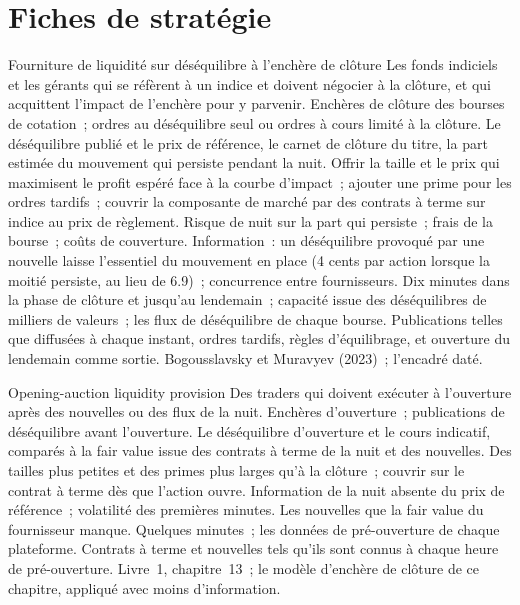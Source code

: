 \section{Fiches de stratégie}

\begin{strategyfile}{Fourniture de liquidité sur déséquilibre à l'enchère de clôture}\label{strat:hf:auctions-and-the-close:close}
 Les fonds indiciels et les gérants qui se réfèrent à un indice et doivent négocier à la clôture, et qui acquittent l'impact de l'enchère pour y parvenir.
 Enchères de clôture des bourses de cotation~; ordres au déséquilibre seul ou ordres à cours limité à la clôture.
 Le déséquilibre publié et le prix de référence, le carnet de clôture du titre, la part estimée du mouvement qui persiste pendant la nuit.
 Offrir la taille et le prix qui maximisent le profit espéré face à la courbe d'impact~; ajouter une prime pour les ordres tardifs~; couvrir
la composante de marché par des contrats à terme sur indice au prix de règlement.
 Risque de nuit sur la part qui persiste~; frais de la bourse~; coûts de couverture.
 Information~: un déséquilibre provoqué par une nouvelle laisse l'essentiel du mouvement en place (4 cents par action lorsque la moitié persiste, au lieu de 6.9)~;
concurrence entre fournisseurs.
 Dix minutes dans la phase de clôture et jusqu'au lendemain~; capacité issue des déséquilibres de milliers de valeurs~; les
flux de déséquilibre de chaque bourse.
 Publications telles que diffusées à chaque instant, ordres tardifs, règles d'équilibrage, et ouverture du lendemain comme sortie.
 Bogousslavsky et Muravyev (2023)~; l'encadré daté.
\end{strategyfile}

\begin{strategyfile}{Opening-auction liquidity provision}\label{strat:hf:auctions-and-the-close:open}
 Des traders qui doivent exécuter à l'ouverture après des nouvelles ou des flux de la nuit.
 Enchères d'ouverture~; publications de déséquilibre avant l'ouverture.
 Le déséquilibre d'ouverture et le cours indicatif, comparés à la fair value issue des contrats à terme de la nuit et des nouvelles.
 Des tailles plus petites et des primes plus larges qu'à la clôture~; couvrir sur le contrat à terme dès que l'action ouvre.
 Information de la nuit absente du prix de référence~; volatilité des premières minutes.
 Les nouvelles que la fair value du fournisseur manque.
 Quelques minutes~; les données de pré-ouverture de chaque plateforme.
 Contrats à terme et nouvelles tels qu'ils sont connus à chaque heure de pré-ouverture.
 Livre~1, chapitre~13~; le modèle d'enchère de clôture de ce chapitre, appliqué avec moins d'information.
\end{strategyfile}

